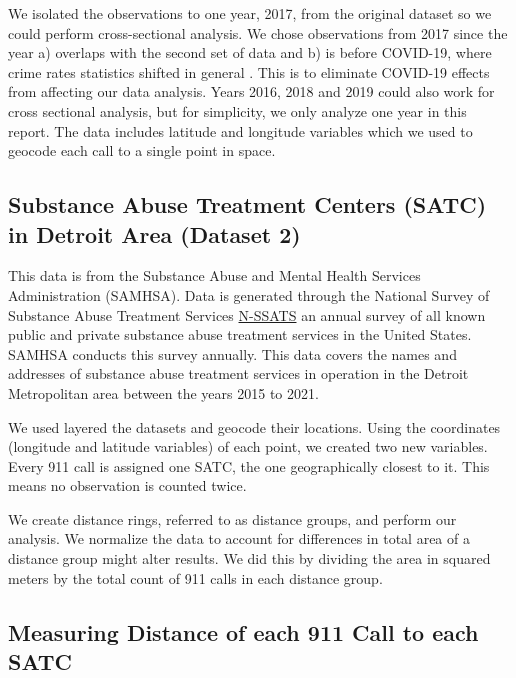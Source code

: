 \documentclass[12pt]{article}
\begin{document}
We isolated the observations to one year, 2017, from the original dataset so we could perform cross-sectional analysis. We chose observations from 2017 since the year a) overlaps with the second set of data and b) is before COVID-19, where crime rates statistics shifted in general \cite{covid_and_crime}. This is to eliminate COVID-19 effects from affecting our data analysis. Years 2016, 2018 and 2019 could also work for cross sectional analysis, but for simplicity, we only analyze one year in this report. The data includes latitude and longitude variables which we used to geocode each call to a single point in space.
\subsection{Substance Abuse Treatment Centers (SATC) in Detroit Area (Dataset 2)}

This data is from the Substance Abuse and Mental Health Services Administration (SAMHSA). Data is generated through the National Survey of Substance Abuse Treatment Services \href{https://www.samhsa.gov/data/data-we-collect/n-ssats-national-survey-substance-abuse-treatment-services}{N-SSATS} an annual survey of all known public and private substance abuse treatment services in the United States. SAMHSA conducts this survey annually. This data covers the names and addresses of substance abuse treatment services in operation in the Detroit Metropolitan area between the years 2015 to 2021. 

 
We used layered the datasets and geocode their locations. Using the coordinates (longitude and latitude variables) of each point, we created two new variables. Every 911 call is assigned one SATC, the one geographically closest to it. This means no observation is counted twice. 

We create distance rings, referred to as distance groups, and perform our analysis. We normalize the data to account for differences in total area of a distance group might alter results. We did this by dividing the area in squared meters by the total count of 911 calls in each distance group.

\subsection{Measuring Distance of each 911 Call to each SATC}
\end{document}
